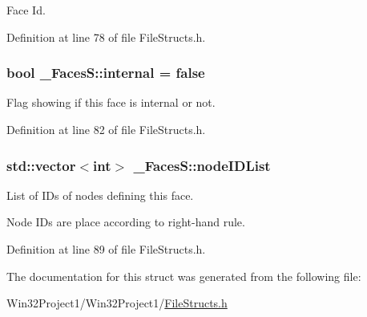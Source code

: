Face Id. 



Definition at line 78 of file File\+Structs.\+h.

\subsubsection[{\texorpdfstring{internal}{internal}}]{\setlength{\rightskip}{0pt plus 5cm}bool \+\_\+\+Faces\+S\+::internal = false}\hypertarget{struct___faces_s_a5ce239e336aea528dad6008a6f2909f0}{}\label{struct___faces_s_a5ce239e336aea528dad6008a6f2909f0}


Flag showing if this face is internal or not. 



Definition at line 82 of file File\+Structs.\+h.

\subsubsection[{\texorpdfstring{node\+I\+D\+List}{nodeIDList}}]{\setlength{\rightskip}{0pt plus 5cm}std\+::vector$<$int$>$ \+\_\+\+Faces\+S\+::node\+I\+D\+List}\hypertarget{struct___faces_s_a1af35bd658b7be0f98e09deb5f8b3ead}{}\label{struct___faces_s_a1af35bd658b7be0f98e09deb5f8b3ead}


List of I\+Ds of nodes defining this face. 

Node I\+Ds are place according to right-\/hand rule. 

Definition at line 89 of file File\+Structs.\+h.



The documentation for this struct was generated from the following file\+:\begin{DoxyCompactItemize}
\item 
Win32\+Project1/\+Win32\+Project1/\hyperlink{_file_structs_8h}{File\+Structs.\+h}\end{DoxyCompactItemize}

